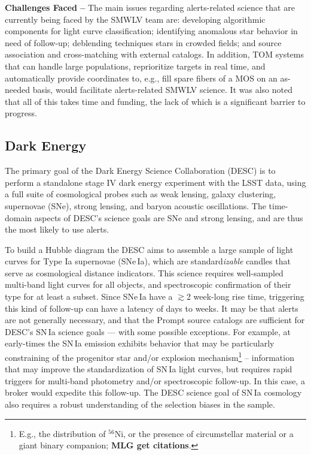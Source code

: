 {\bf Challenges Faced --} The main issues regarding alerts-related science that are currently being faced by the SMWLV team are: 
developing algorithmic components for light curve classification;
identifying anomalous star behavior in need of follow-up; 
deblending techniques stars in crowded fields; and
source association and cross-matching with external catalogs.
In addition, TOM systems that can handle large populations, reprioritize targets in real time, and automatically provide coordinates to, e.g., fill spare fibers of a MOS on an as-needed basis, would facilitate alerts-related SMWLV science. It was also noted that all of this takes time and funding, the lack of which is a significant barrier to progress.

\subsection{Dark Energy}\label{ssec:sci_desc}

The primary goal of the Dark Energy Science Collaboration (DESC) is to perform a standalone stage IV dark energy experiment with the LSST data, using a full suite of cosmological probes such as weak lensing, galaxy clustering, supernovae (SNe), strong lensing, and baryon acoustic oscillations. The time-domain aspects of DESC's science goals are SNe and strong lensing, and are thus the most likely to use alerts. 

To build a Hubble diagram the DESC aims to assemble a large sample of light curves for Type Ia supernovae (SNe\,Ia), which are standard{\it izable} candles that serve as cosmological distance indicators. This science requires well-sampled multi-band light curves for all objects, and spectroscopic confirmation of their type for at least a subset. Since SNe\,Ia have a $\gtrsim$2 week-long rise time, triggering this kind of follow-up can have a latency of days to weeks. It may be that alerts are not generally necessary, and that the Prompt source catalogs are sufficient for DESC's SN\,Ia science goals --- with some possible exceptions. For example, at early-times the SN\,Ia emission exhibits behavior that may be particularly constraining of the progenitor star and/or explosion mechanism\footnote{E.g., the distribution of $^56$Ni, or the presence of circumstellar material or a giant binary companion; {\bf MLG get citations}.} -- information that may improve the standardization of SN\,Ia light curves, but requires rapid triggers for multi-band photometry and/or spectroscopic follow-up. In this case, a broker would expedite this follow-up. The DESC science goal of SN\,Ia cosmology also requires a robust understanding of the selection biases in the sample.


